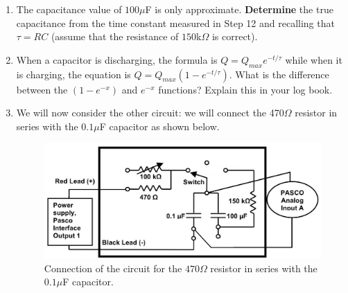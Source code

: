 \documentclass[12pt]{report}
\begin{document}
\begin{enumerate}
\item The capacitance value of $100 \mu$F is only approximate. \textbf{Determine} the true capacitance from the time constant measured in Step 12 and recalling that $\tau=RC$ (assume that the resistance of $150$k$\Omega$ is correct).
\item When a capacitor is discharging, the formula is $Q=Q_{max} e^{-t/\tau}$ while when it is charging, the equation is $Q=Q_{max} (1 - e^{-t/\tau})$. What is the difference between the $(1-e^{-x})$ and $e^{-x}$ functions? Explain this in your log book.
\item We will now consider the other circuit: we will connect the 470$\Omega$ resistor in series with the $0.1\mu$F capacitor as shown below.
\begin{figure}[h]
\centering
\includegraphics[width=0.75\linewidth]{lab2-session1-circuit2}
\caption{Connection of the circuit for the $470\Omega$ resistor in series with the $0.1\mu$F capacitor.}
\label{Fig:lab2-session1-circuit2}
\end{figure}


\end{enumerate}
\end{document}
